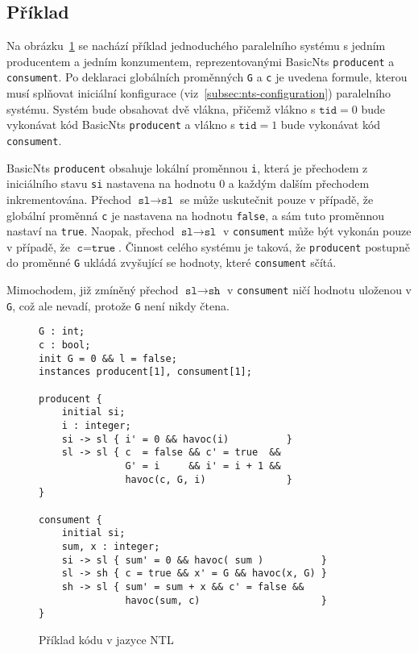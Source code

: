 \documentclass[12pt]{fithesis2}
\begin{document}
\subsection{Příklad}
Na obrázku~\ref{fig:nts-prodcons} se nachází příklad jednoduchého paralelního systému s jedním producentem a jedním konzumentem, reprezentovanými BasicNts \texttt{producent} a \texttt{consument}. Po deklaraci globálních proměnných \texttt{G} a \texttt{c} je uvedena formule, kterou musí splňovat iniciální konfigurace  (viz~\ref{subsec:nts-configuration}) paralelního systému. Systém bude obsahovat dvě vlákna, přičemž vlákno s $\texttt{tid} = 0$ bude vykonávat kód BasicNts \texttt{producent} a vlákno s $\texttt{tid} = 1$ bude vykonávat kód \texttt{consument}.

BasicNts \texttt{producent} obsahuje lokální proměnnou \texttt{i}, která je přechodem z iniciálního stavu \texttt{si} nastavena na hodnotu $0$ a každým dalším přechodem inkrementována. Přechod $\texttt{sl} \rightarrow \texttt{sl}$ se může uskutečnit pouze v případě, že globální proměnná \texttt{c} je nastavena na  hodnotu \texttt{false}, a sám tuto proměnnou nastaví na \texttt{true}. Naopak, přechod $\texttt{sl} \rightarrow \texttt{sl}$ v \texttt{consument} může být vykonán pouze v případě, že $\texttt{c} = \texttt{true}$. Činnost celého systému je taková, že \texttt{producent} postupně do proměnné \texttt{G} ukládá zvyšující se hodnoty, které \texttt{consument} sčítá.

Mimochodem, již zmíněný přechod $\texttt{sl} \rightarrow \texttt{sh}$ v \texttt{consument} ničí hodnotu uloženou v \texttt{G}, což ale nevadí, protože \texttt{G} není nikdy čtena.

\begin{figure}[t]
\begin{lstlisting}
G : int;
c : bool;
init G = 0 && l = false;
instances producent[1], consument[1];

producent {
    initial si;
    i : integer;
    si -> sl { i' = 0 && havoc(i)          }
    sl -> sl { c  = false && c' = true  &&
               G' = i     && i' = i + 1 &&
               havoc(c, G, i)              }
}

consument {
	initial si;
	sum, x : integer;
	si -> sl { sum' = 0 && havoc( sum )          }
	sl -> sh { c = true && x' = G && havoc(x, G) }
	sh -> sl { sum' = sum + x && c' = false &&
	           havoc(sum, c)                     }
}

\end{lstlisting}
\caption{Příklad kódu v jazyce NTL}
\label{fig:nts-prodcons}
\end{figure}
\end{document}
